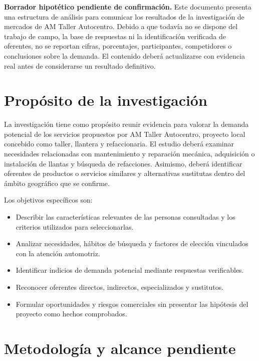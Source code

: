 \documentclass[12pt,letterpaper,oneside]{article}
\begin{document}
\textbf{Borrador hipotético pendiente de confirmación.} Este documento presenta una estructura de análisis para comunicar los resultados de la investigación de mercados de AM Taller Autocentro. Debido a que todavía no se dispone del trabajo de campo, la base de respuestas ni la identificación verificada de oferentes, no se reportan cifras, porcentajes, participantes, competidores o conclusiones sobre la demanda. El contenido deberá actualizarse con evidencia real antes de considerarse un resultado definitivo.

\section{Propósito de la investigación}

La investigación tiene como propósito reunir evidencia para valorar la demanda potencial de los servicios propuestos por AM Taller Autocentro, proyecto local concebido como taller, llantera y refaccionaria. El estudio deberá examinar necesidades relacionadas con mantenimiento y reparación mecánica, adquisición o instalación de llantas y búsqueda de refacciones. Asimismo, deberá identificar oferentes de productos o servicios similares y alternativas sustitutas dentro del ámbito geográfico que se confirme.

Los objetivos específicos son:

\begin{itemize}
    \item Describir las características relevantes de las personas consultadas y los criterios utilizados para seleccionarlas.
    \item Analizar necesidades, hábitos de búsqueda y factores de elección vinculados con la atención automotriz.
    \item Identificar indicios de demanda potencial mediante respuestas verificables.
    \item Reconocer oferentes directos, indirectos, especializados y sustitutos.
    \item Formular oportunidades y riesgos comerciales sin presentar las hipótesis del proyecto como hechos comprobados.
\end{itemize}

\section{Metodología y alcance pendiente}
\end{document}
